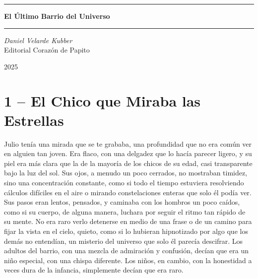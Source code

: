 \documentclass[a4paper,12pt]{book}
\begin{document}
\begin{titlepage}
    \centering
    \vspace*{\baselineskip}
    \rule{\textwidth}{1pt}\vspace{0.5\baselineskip}
    {\Huge\bfseries El Último Barrio del Universo}\\[0.5\baselineskip]
    \rule{\textwidth}{1pt}\vspace{3\baselineskip}
    {\Large\itshape Daniel Velarde Kubber}\\[2\baselineskip]
    \vfill
    {\large Editorial Corazón de Papito}\par
    {\large 2025}\par
\end{titlepage}

\tableofcontents
\cleardoublepage %

\chapter*{1 – El Chico que Miraba las Estrellas}

Julio tenía una mirada que se te grababa, una profundidad que no era común ver en alguien tan joven. Era flaco, con una delgadez que lo hacía parecer ligero, y su piel era más clara que la de la mayoría de los chicos de su edad, casi transparente bajo la luz del sol. Sus ojos, a menudo un poco cerrados, no mostraban timidez, sino una concentración constante, como si todo el tiempo estuviera resolviendo cálculos difíciles en el aire o mirando constelaciones enteras que solo él podía ver. Sus pasos eran lentos, pensados, y caminaba con los hombros un poco caídos, como si su cuerpo, de alguna manera, luchara por seguir el ritmo tan rápido de su mente. No era raro verlo detenerse en medio de una frase o de un camino para fijar la vista en el cielo, quieto, como si lo hubieran hipnotizado por algo que los demás no entendían, un misterio del universo que solo él parecía descifrar. Los adultos del barrio, con una mezcla de admiración y confusión, decían que era un niño especial, con una chispa diferente. Los niños, en cambio, con la honestidad a veces dura de la infancia, simplemente decían que era raro.
\end{document}
